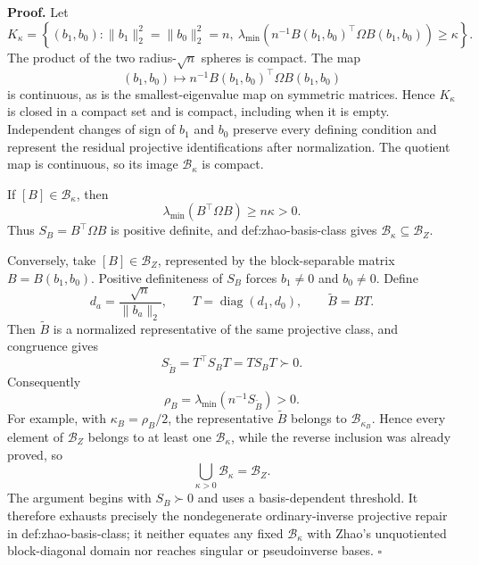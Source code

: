 \textbf{Proof.}
Let
\[
K_\kappa=
\left\{(b_1,b_0):
\lVert b_1\rVert_2^2=\lVert b_0\rVert_2^2=n,
\ \lambda_{\min}\!\left(n^{-1}B(b_1,b_0)^{\top}\Omega B(b_1,b_0)\right)\ge\kappa
\right\}.
\]
The product of the two radius-\(\sqrt n\) spheres is compact.  The map
\[
(b_1,b_0)\longmapsto n^{-1}B(b_1,b_0)^{\top}\Omega B(b_1,b_0)
\]
is continuous, as is the smallest-eigenvalue map on symmetric matrices.  Hence \(K_\kappa\) is closed in a compact set and is compact, including when it is empty.  Independent changes of sign of \(b_1\) and \(b_0\) preserve every defining condition and represent the residual projective identifications after normalization.  The quotient map is continuous, so its image \(\mathcal B_\kappa\) is compact.

If \([B]\in\mathcal B_\kappa\), then
\[
\lambda_{\min}(B^{\top}\Omega B)\ge n\kappa>0.
\]
Thus \(S_B=B^{\top}\Omega B\) is positive definite, and def:zhao-basis-class gives \(\mathcal B_\kappa\subseteq\mathcal B_Z\).

Conversely, take \([B]\in\mathcal B_Z\), represented by the block-separable matrix \(B=B(b_1,b_0)\).  Positive definiteness of \(S_B\) forces \(b_1\ne0\) and \(b_0\ne0\).  Define
\[
d_a=\frac{\sqrt n}{\lVert b_a\rVert_2},
\qquad
T=\operatorname{diag}(d_1,d_0),
\qquad
\widetilde B=BT.
\]
Then \(\widetilde B\) is a normalized representative of the same projective class, and congruence gives
\[
S_{\widetilde B}=T^{\top}S_BT=TS_BT\succ0.
\]
Consequently
\[
\rho_B=\lambda_{\min}(n^{-1}S_{\widetilde B})>0.
\]
For example, with \(\kappa_B=\rho_B/2\), the representative \(\widetilde B\) belongs to \(\mathcal B_{\kappa_B}\).  Hence every element of \(\mathcal B_Z\) belongs to at least one \(\mathcal B_\kappa\), while the reverse inclusion was already proved, so
\[
\bigcup_{\kappa>0}\mathcal B_\kappa=\mathcal B_Z.
\]
The argument begins with \(S_B\succ0\) and uses a basis-dependent threshold.  It therefore exhausts precisely the nondegenerate ordinary-inverse projective repair in def:zhao-basis-class; it neither equates any fixed \(\mathcal B_\kappa\) with Zhao's unquotiented block-diagonal domain nor reaches singular or pseudoinverse bases. \(\square\)